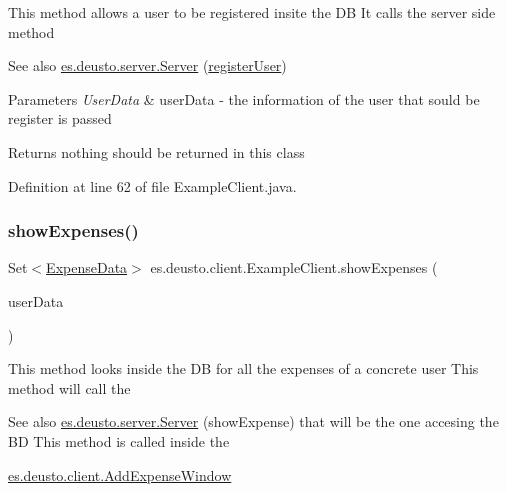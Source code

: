 This method allows a user to be registered insite the DB It calls the server side method \begin{DoxySeeAlso}{See also}
\hyperlink{classes_1_1deusto_1_1server_1_1_server}{es.\+deusto.\+server.\+Server} (\hyperlink{classes_1_1deusto_1_1client_1_1_example_client_a1c17371c17dde2b7664f2ad17ee79e4b}{register\+User}) 
\end{DoxySeeAlso}

\begin{DoxyParams}{Parameters}
{\em User\+Data} & user\+Data -\/ the information of the user that sould be register is passed \\
\hline
\end{DoxyParams}
\begin{DoxyReturn}{Returns}
nothing should be returned in this class 
\end{DoxyReturn}


Definition at line 62 of file Example\+Client.\+java.

\mbox{\label{classes_1_1deusto_1_1client_1_1_example_client_a527d2790290c153cae5b16133a38269a}} 
\subsubsection{\texorpdfstring{show\+Expenses()}{showExpenses()}}
{\footnotesize\ttfamily Set$<$\hyperlink{classes_1_1deusto_1_1serialization_1_1_expense_data}{Expense\+Data}$>$ es.\+deusto.\+client.\+Example\+Client.\+show\+Expenses (\begin{DoxyParamCaption}\item[{\hyperlink{classes_1_1deusto_1_1serialization_1_1_user_data}{User\+Data}}]{user\+Data }\end{DoxyParamCaption})}

This method looks inside the DB for all the expenses of a concrete user This method will call the \begin{DoxySeeAlso}{See also}
\hyperlink{classes_1_1deusto_1_1server_1_1_server}{es.\+deusto.\+server.\+Server} (show\+Expense) that will be the one accesing the BD This method is called inside the 

\hyperlink{classes_1_1deusto_1_1client_1_1_add_expense_window}{es.\+deusto.\+client.\+Add\+Expense\+Window} 
\end{DoxySeeAlso}


